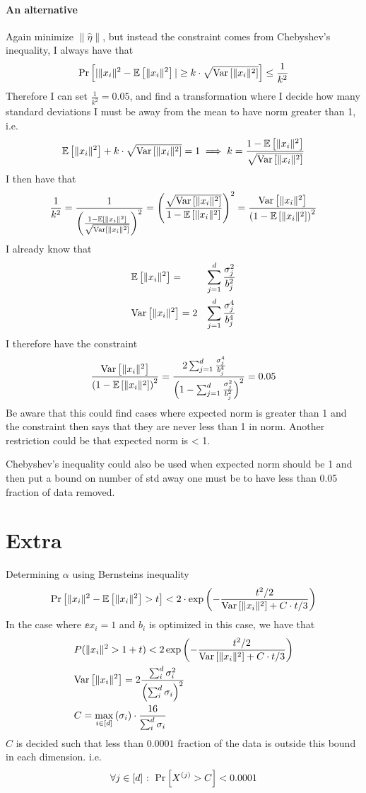 \documentclass[a4paper,12pt]{article}
\begin{document}
\paragraph*{An alternative}
Again minimize $\| \hat{\eta} \|$, but instead the constraint
comes from Chebyshev's inequality, I always have that
\[
    \Pr\left [ |\|x_i\|^2 - \mathbb{E} \left [ \| x_i \|^2 \right]| \ge k \cdot \sqrt{\text{Var} \left [ \|x_i\|^2  \right]} \right] \le \frac{1}{k^2}
\]
Therefore I can set $\frac{1}{k^2} = 0.05$, and find a 
transformation where I decide how many standard deviations
I must be away from the mean to have norm greater than 1, i.e.
\begin{align*}
    \mathbb{E} \left [ \| x_i \|^2 \right] + k \cdot \sqrt{\text{Var} \left [ \|x_i\|^2  \right]} = 1 \implies k = \frac{1-\mathbb{E} \left [ \| x_i \|^2 \right]}{\sqrt{\text{Var} \left [ \|x_i\|^2  \right]}}
\end{align*}
I then have that
\[
    \frac{1}{k^2} = \frac{1}{\left (\frac{1-\mathbb{E} \left [ \| x_i \|^2 \right]}{\sqrt{\text{Var} \left [ \|x_i\|^2  \right]}}\right)^2} = 
    \left (\frac{\sqrt{\text{Var} \left [ \|x_i\|^2  \right]}}{1-\mathbb{E} \left [ \| x_i \|^2 \right]}\right)^2 = 
    \frac{\text{Var} \left [ \|x_i \|^2  \right]}{\left (1 - \mathbb{E} \left [ \| x_i \|^2 \right]\right)^2}
\]
I already know that
\begin{alignat*}{2}
    &\mathbb{E} \left [ \| x_i \|^2 \right] = &\sum_{j=1}^d \frac{\sigma_j^2}{b_j^2} \\
    &\text{Var} \left [ \|x_i \|^2  \right] = 2 &\sum_{j=1}^d \frac{\sigma_j^4}{b_j^4}
\end{alignat*}
I therefore have the constraint 
\[
    \frac{\text{Var} \left [ \|x_i \|^2  \right]}{\left (1 - \mathbb{E} \left [ \| x_i \|^2 \right]\right)^2} = 
    \frac{2 \sum_{j=1}^d \frac{\sigma_j^4}{b_j^4} \\}
    {\left (1-\sum_{j=1}^d \frac{\sigma_j^2}{b_j^2} \right)^2} = 
    0.05
\]
Be aware that this could find cases where expected norm is greater than 1
and the constraint then says that they are never less than 1 in norm.
Another restriction could be that expected norm is < 1.

Chebyshev's inequality could also be used when expected norm should be 1
and then put a bound on number of std away one must be to have less than 
0.05 fraction of data removed.

\newpage


\newpage

\section*{Extra}
Determining $\alpha$ using Bernsteins inequality
\[
    \Pr\left [\|x_i\|^2 - \mathbb{E} \left [ \| x_i \|^2 \right] > t \right] < 2 \cdot \exp \left (- \frac{t^2/2}{\text{Var} \left [ \|x_i\|^2  \right] + C \cdot t/3}\right)
\]
In the case where $\ee{x_i} = 1$ and $b_i$ is optimized in this case,
we have that
\begin{align*}
    &P(\|x_i\|^2 > 1 + t) < 2 \exp \left (- \frac{t^2/2}{\text{Var} \left [ \|x_i\|^2  \right] + C \cdot t/3}\right) \\
    &\text{Var} \left [ \| x_i \|^2  \right] = 2 \frac{\sum_i^d \sigma_i^2}{\left (\sum_i^d \sigma_i\right)^2} \\
    &C = \max_{i \in [d]} \left (\sigma_i\right) \cdot \frac{16}{\sum_i^d \sigma_i}
\end{align*}
$C$ is decided such that less than $0.0001$ fraction of the data is outside this bound
in each dimension. i.e. 
\[
    \forall j \in [d] \text{ : }\Pr\left [X^{(j)} > C \right] < 0.0001
\]
\end{document}
